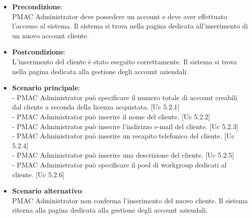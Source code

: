 {\begin{itemize}
\item \textbf{Precondizione}:\\
PMAC Administrator deve possedere un account e deve aver effettuato l'accesso al sistema. Il sistema si trova nella pagina dedicata all'inserimento di un nuovo account cliente.

\item \textbf{Postcondizione}:\\
L'inserimento del cliente è stato eseguito correttamente. Il sistema si trova nella pagina dedicata alla gestione degli account aziendali.

\item \textbf{Scenario principale}:\\
- PMAC Administrator può specificare il numero totale di account creabili dal cliente a seconda della licenza acquistata. [Uc 5.2.1]\\
- PMAC Administrator può inserire il nome del cliente. [Uc 5.2.2]\\
- PMAC Administrator può inserire l'indirizzo e-mail del cliente. [Uc 5.2.3]\\
- PMAC Administrator può inserire un recapito telefonico del cliente. [Uc 5.2.4]\\
- PMAC Administrator può inserire una descrizione del cliente. [Uc 5.2.5]\\
- PMAC Administrator può specificare il pool di workgroup dedicati al cliente. [Uc 5.2.6]

\item \textbf{Scenario alternativo}:\\
PMAC Administrator non conferma l'inserimento del nuovo cliente. Il sistema ritorna alla pagina dedicata alla gestione degli account aziendali.

\end{itemize}


}
